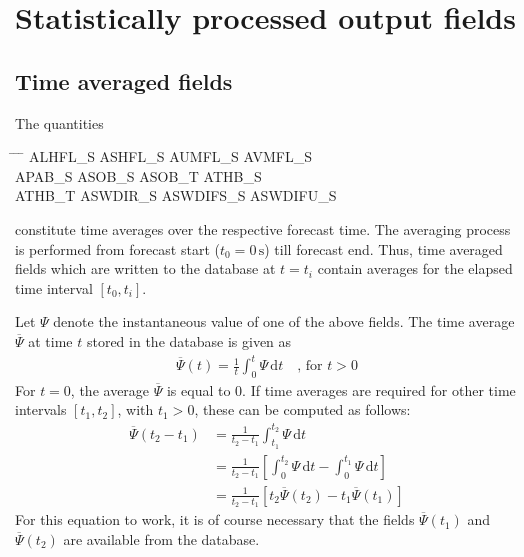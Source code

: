 \section{Statistically processed output fields}
\label{sec_statproc_fields}

\subsection{Time averaged fields}

The quantities
\begin{note}
\begin{tabbing}
  \hspace{0.2\textwidth} \= \hspace{0.2\textwidth} \= \hspace{0.2\textwidth} \= \hspace{0.2\textwidth} \kill
  ALHFL\_S \>
  ASHFL\_S \>
  AUMFL\_S \>
  AVMFL\_S \\
  APAB\_S  \>
  ASOB\_S  \>
  ASOB\_T  \>
  ATHB\_S  \\
  ATHB\_T  \>
  ASWDIR\_S  \>
  ASWDIFS\_S  \>
  ASWDIFU\_S
\end{tabbing}
\end{note}

constitute time averages over the respective forecast time. The averaging process is performed from forecast start  
($t_{0}=0\,\mathrm{s}$) till forecast end. Thus, time averaged fields which are written to the database at $t=t_{i}$ 
contain averages for the elapsed time interval $[t_{0}, t_{i}]$.

Let $\Psi$ denote the instantaneous value of one of the above fields. The time average $\overline{\Psi}$ at time $t$ stored in the 
database is given as
\begin{align}
 \overline{\Psi}(t) = \frac{1}{t}\int_{0}^{t} \Psi\, \mathrm{d}t  \quad \text{, for } t>0
\end{align}
For $t=0$, the average $\overline{\Psi}$ is equal to 0. 
If time averages are required for other time intervals $[t_{1},t_{2}]$, with $t_{1}>0$, these can be computed as follows:
\begin{align}
 \overline{\Psi}(t_{2}-t_{1}) &= \frac{1}{t_{2}-t_{1}}\int_{t_{1}}^{t_{2}} \Psi\,\mathrm{d}t \\
                              &= \frac{1}{t_{2}-t_{1}} \left[\int_{0}^{t_{2}} \Psi\,\mathrm{d}t  - \int_{0}^{t_{1}} \Psi\,\mathrm{d}t \right] \\
                              &= \frac{1}{t_{2}-t_{1}} \left[ t_{2}\overline{\Psi}(t_{2}) - t_{1}\overline{\Psi}(t_{1}) \right]
\end{align}
For this equation to work, it is of course necessary that the fields $\overline{\Psi}(t_{1})$ and $\overline{\Psi}(t_{2})$ are available from the database.



